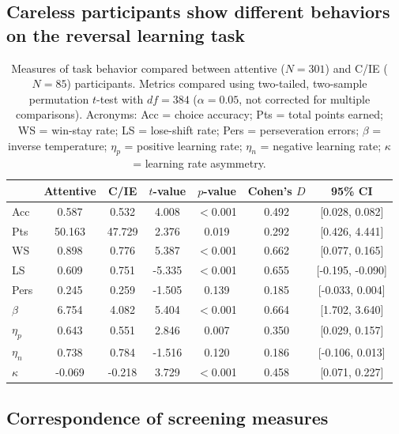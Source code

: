 \documentclass[a4paper,notitlepage,12pt]{article}
\begin{document}
\begin{refsection}[supp]
\subsection*{Careless participants show different behaviors on the reversal learning task}
\begin{table}[H]
    \centering
    \begin{tabular}{lcccccc}
    \toprule
    {} &  Attentive &    C/IE &   $t$-value &   $p$-value &  Cohen's $D$ & 95\% CI \\
    \midrule
    Acc      &      0.587 &   0.532 &  4.008 &  $<$0.001 &  0.492 &    [0.028, 0.082] \\
    Pts      &     50.163 &  47.729 &  2.376 &     0.019 &  0.292 &    [0.426, 4.441] \\
    WS       &      0.898 &   0.776 &  5.387 &  $<$0.001 &  0.662 &    [0.077, 0.165] \\
    LS       &      0.609 &   0.751 & -5.335 &  $<$0.001 &  0.655 &  [-0.195, -0.090] \\
    Pers     &      0.245 &   0.259 & -1.505 &     0.139 &  0.185 &   [-0.033, 0.004] \\
    $\beta$  &      6.754 &   4.082 &  5.404 &  $<$0.001 &  0.664 &    [1.702, 3.640] \\
    $\eta_p$ &      0.643 &   0.551 &  2.846 &     0.007 &  0.350 &    [0.029, 0.157] \\
    $\eta_n$ &      0.738 &   0.784 & -1.516 &     0.120 &  0.186 &   [-0.106, 0.013] \\
    $\kappa$ &     -0.069 &  -0.218 &  3.729 &  $<$0.001 &  0.458 &    [0.071, 0.227] \\
    \bottomrule
    \end{tabular}
    \captionsetup{width=0.88\textwidth}
    \caption{Measures of task behavior compared between attentive ($N=301$) and C/IE ($N=85$) participants. Metrics compared using two-tailed, two-sample permutation $t$-test with $df=384$ ($\alpha = 0.05$, not corrected for multiple comparisons). Acronyms: Acc = choice accuracy; Pts = total points earned; WS = win-stay rate; LS = lose-shift rate; Pers = perseveration errors; $\beta$ = inverse temperature; $\eta_p$ = positive learning rate; $\eta_n$ = negative learning rate; $\kappa$ = learning rate asymmetry.}
\end{table}

\clearpage
\subsection*{Correspondence of screening measures}


\end{refsection}
\end{document}
